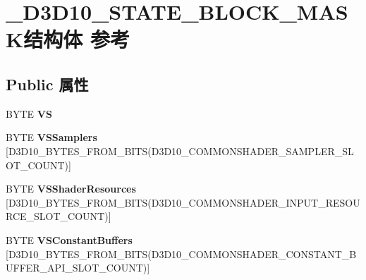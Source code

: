\hypertarget{struct___d3_d10___s_t_a_t_e___b_l_o_c_k___m_a_s_k}{}\section{\+\_\+\+D3\+D10\+\_\+\+S\+T\+A\+T\+E\+\_\+\+B\+L\+O\+C\+K\+\_\+\+M\+A\+S\+K结构体 参考}
\label{struct___d3_d10___s_t_a_t_e___b_l_o_c_k___m_a_s_k}
\subsection*{Public 属性}
\begin{DoxyCompactItemize}
\item 
\mbox{\label{struct___d3_d10___s_t_a_t_e___b_l_o_c_k___m_a_s_k_aa18482f3b3ef346d52f8981133225686}} 
B\+Y\+TE {\bfseries VS}
\item 
\mbox{\label{struct___d3_d10___s_t_a_t_e___b_l_o_c_k___m_a_s_k_ace42ff3cbd3722300297e7ce112aa3b5}} 
B\+Y\+TE {\bfseries V\+S\+Samplers} \mbox{[}D3\+D10\+\_\+\+B\+Y\+T\+E\+S\+\_\+\+F\+R\+O\+M\+\_\+\+B\+I\+TS(D3\+D10\+\_\+\+C\+O\+M\+M\+O\+N\+S\+H\+A\+D\+E\+R\+\_\+\+S\+A\+M\+P\+L\+E\+R\+\_\+\+S\+L\+O\+T\+\_\+\+C\+O\+U\+NT)\mbox{]}
\item 
\mbox{\label{struct___d3_d10___s_t_a_t_e___b_l_o_c_k___m_a_s_k_a5ded6edda930c37dd5c348658b1b6cda}} 
B\+Y\+TE {\bfseries V\+S\+Shader\+Resources} \mbox{[}D3\+D10\+\_\+\+B\+Y\+T\+E\+S\+\_\+\+F\+R\+O\+M\+\_\+\+B\+I\+TS(D3\+D10\+\_\+\+C\+O\+M\+M\+O\+N\+S\+H\+A\+D\+E\+R\+\_\+\+I\+N\+P\+U\+T\+\_\+\+R\+E\+S\+O\+U\+R\+C\+E\+\_\+\+S\+L\+O\+T\+\_\+\+C\+O\+U\+NT)\mbox{]}
\item 
\mbox{\label{struct___d3_d10___s_t_a_t_e___b_l_o_c_k___m_a_s_k_af6661111a487ea3262decf1f7cf0a0f4}} 
B\+Y\+TE {\bfseries V\+S\+Constant\+Buffers} \mbox{[}D3\+D10\+\_\+\+B\+Y\+T\+E\+S\+\_\+\+F\+R\+O\+M\+\_\+\+B\+I\+TS(D3\+D10\+\_\+\+C\+O\+M\+M\+O\+N\+S\+H\+A\+D\+E\+R\+\_\+\+C\+O\+N\+S\+T\+A\+N\+T\+\_\+\+B\+U\+F\+F\+E\+R\+\_\+\+A\+P\+I\+\_\+\+S\+L\+O\+T\+\_\+\+C\+O\+U\+NT)\mbox{]}
\item 

\end{DoxyCompactItemize}
